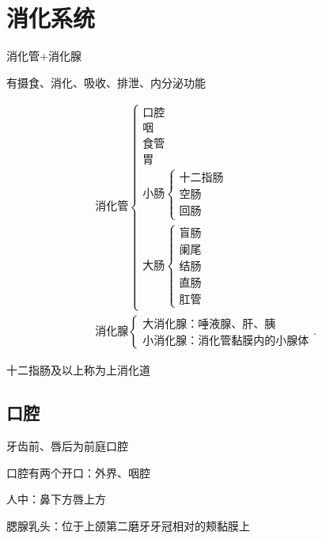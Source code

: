\section{消化系统}%
\label{sec:消化系统}
\begin{defi}
    消化管+消化腺

    有摄食、消化、吸收、排泄、内分泌功能
\end{defi}
\begin{align*}
    \text{消化管}\begin{cases}
        \text{口腔}\\
        \text{咽}\\
        \text{食管}\\
        \text{胃}\\
        \text{小肠}\begin{cases}
            \text{十二指肠}\\
            \text{空肠}\\
            \text{回肠}
        \end{cases}\\
        \text{大肠}\begin{cases}
            \text{盲肠}\\
            \text{阑尾}\\
            \text{结肠}\\
            \text{直肠}\\
            \text{肛管}
        \end{cases}
    \end{cases}\\
    \text{消化腺}\begin{cases}
        \text{大消化腺：唾液腺、肝、胰}\\
        \text{小消化腺：消化管黏膜内的小腺体}
    \end{cases}
.\end{align*}
\begin{notation}
    十二指肠及以上称为上消化道
\end{notation}
\subsection{口腔}%
\label{sub:口腔}
\begin{notation}
    牙齿前、唇后为前庭口腔

    口腔有两个开口：外界、咽腔
\end{notation}
\begin{notation}
    人中：鼻下方唇上方

    腮腺乳头：位于上颌第二磨牙牙冠相对的颊黏膜上
\end{notation}
